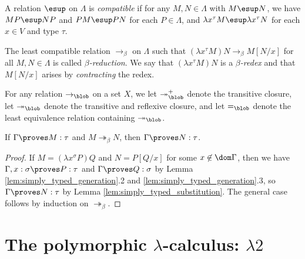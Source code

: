 \documentclass[reqno]{amsart}
\begin{document}
    \begin{definition}
        A relation $\esup$ on $\Lambda$ is \textit{compatible} if for any $M,N\in\Lambda$ with $M\esup N$, we have $MP\esup NP$ and $PM\esup PN$ for each $P\in\Lambda$, and $\lambda x^\tau M\esup\lambda x^\tau N$ for each $x\in V$ and type $\tau$.
    \end{definition}

    \begin{definition}
        The least compatible relation $\rightarrow_\beta$ on $\Lambda$ such that $(\lambda x^\tau M)N\rightarrow_\beta M[N/x]$ for all $M,N\in\Lambda$ is called \textit{$\beta$-reduction}. We say that $(\lambda x^\tau M)N$ is a \textit{$\beta$-redex} and that $M[N/x]$ arises by \textit{contracting} the redex.
    \end{definition}

    \begin{notation}
        For any relation $\rightarrow_\blob$ on a set $X$, we let $\twoheadrightarrow_\blob^+$ denote the transitive closure, let $\twoheadrightarrow_\blob$ denote the transitive and reflexive closure, and let $=_\blob$ denote the least equivalence relation containing $\twoheadrightarrow_\blob$.
    \end{notation}

    \begin{theorem}
        If $\Gamma\proves M:\tau$ and $M\twoheadrightarrow_\beta N$, then $\Gamma\proves N:\tau$.
    \end{theorem}
    \begin{proof}
        If $M=(\lambda x^\sigma P)Q$ and $N=P[Q/x]$ for some $x\not\in\dom\Gamma$, then we have $\Gamma,x:\sigma\proves P:\tau$ and $\Gamma\proves Q:\sigma$ by Lemma \ref{lem:simply_typed_generation}.2 and \ref{lem:simply_typed_generation}.3, so $\Gamma\proves N:\tau$ by Lemma \ref{lem:simply_typed_substitution}. The general case follows by induction on $\twoheadrightarrow_\beta$.
    \end{proof}

    \section{The polymorphic $\lambda$-calculus: $\lambda2$}

    \begin{definition}
        
    \end{definition}
\end{document}
